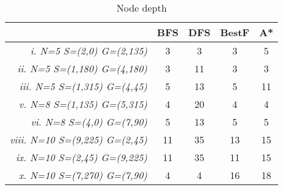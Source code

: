 \begin{table}[ht]
\centering
\begin{tabular}{r|c|c|c|c|}
\cline{2-5}
\multicolumn{1}{l|}{} & \textbf{BFS} & \textbf{DFS} & \textbf{BestF} & \textbf{A*} \\ \hline
\multicolumn{1}{|r|}{\textit{i. N=5 S=(2,0) G=(2,135)}} & 3 & 3 & 3 & 5 \\ \hline
\multicolumn{1}{|r|}{\textit{ii. N=5 S=(1,180) G=(4,180)}} & 3 & 11 & 3 & 3 \\ \hline
\multicolumn{1}{|r|}{\textit{iii. N=5 S=(1,315) G=(4,45)}} & 5 & 13 & 5 & 11 \\ \hline
\multicolumn{1}{|r|}{\textit{v. N=8 S=(1,135) G=(5,315)}} & 4 & 20 & 4 & 4 \\ \hline
\multicolumn{1}{|r|}{\textit{vi. N=8 S=(4,0) G=(7,90)}} & 5 & 13 & 5 & 5 \\ \hline
\multicolumn{1}{|r|}{\textit{viii. N=10 S=(9,225) G=(2,45)}} & 11 & 35 & 13 & 15 \\ \hline
\multicolumn{1}{|r|}{\textit{ix. N=10 S=(2,45) G=(9,225)}} & 11 & 35 & 11 & 15 \\ \hline
\multicolumn{1}{|r|}{\textit{x. N=10 S=(7,270) G=(7,90)}} & 4 & 4 & 16 & 18 \\ \hline
\end{tabular}
\caption{Node depth}
\label{tab:node_depth}
\end{table}